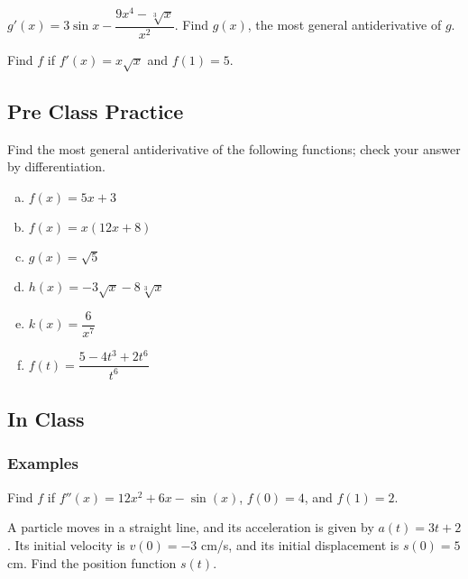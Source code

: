 \documentclass[notes]{subfiles}
\begin{document}
		\begin{ex}
			\(g'(x) = 3\sin x - \dfrac{9x^4-\sqrt[3]{x}}{x^2}\).  Find \(g(x)\), the most general antiderivative of \(g\).
		\end{ex}
			
		\begin{ex}
			Find \(f\) if \(f'(x) = x\sqrt{x}\) and \(f(1) = 5\).
		\end{ex}
			\newpage
			
	\subsection*{Pre Class Practice}
		\begin{ex}
			Find the most general antiderivative of the following functions; check your answer by differentiation.
			\begin{enumerate}[(a)]
				\item \(f(x) = 5x + 3\)
					
				\item \(f(x) = x(12x + 8)\)
					
				\item \(g(x) = \sqrt{5}\)
					
				\item \(h(x) = -3\sqrt{x} - 8\sqrt[3]{x}\)
					
				\item \(k(x) = \dfrac{6}{x^7}\)
					
				\item \(f(t) = \dfrac{5-4t^3 + 2t^6}{t^6}\)
			\end{enumerate}
		\end{ex}
			\newpage
		
	\subsection*{In Class}	
	\subsubsection*{Examples}
		\begin{ex}
			Find \(f\) if \(f''(x) = 12x^2+6x-\sin(x)\), \(f(0) = 4\), and \(f(1) = 2\).
		\end{ex}
			\vs{1}
			
		\begin{ex}
			A particle moves in a straight line, and its acceleration is given by \(a(t) = 3t+2\).  Its initial velocity is \(v(0) = -3\) cm/s, and its initial displacement is \(s(0) = 5\) cm.  Find the position function \(s(t)\).
		\end{ex}
			\vs{1}
			\newpage
			
\end{document}

